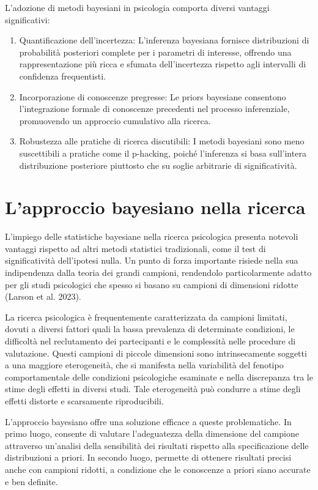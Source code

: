 \documentclass[
  letterpaper,
  krantz2]{{[}./krantz{]}}
\providecommand{\tightlist}{%
  \setlength{\itemsep}{0pt}\setlength{\parskip}{0pt}}\usepackage{longtable,booktabs,array}
\begin{document}
L'adozione di metodi bayesiani in psicologia comporta diversi vantaggi
significativi:

\begin{enumerate}
\def\labelenumi{\arabic{enumi}.}
\tightlist
\item
  Quantificazione dell'incertezza: L'inferenza bayesiana fornisce
  distribuzioni di probabilità posteriori complete per i parametri di
  interesse, offrendo una rappresentazione più ricca e sfumata
  dell'incertezza rispetto agli intervalli di confidenza frequentisti.
\item
  Incorporazione di conoscenze pregresse: Le priors bayesiane consentono
  l'integrazione formale di conoscenze precedenti nel processo
  inferenziale, promuovendo un approccio cumulativo alla ricerca.
\item
  Robustezza alle pratiche di ricerca discutibili: I metodi bayesiani
  sono meno suscettibili a pratiche come il p-hacking, poiché
  l'inferenza si basa sull'intera distribuzione posteriore piuttosto che
  su soglie arbitrarie di significatività.
\end{enumerate}

\section{L'approccio bayesiano nella
ricerca}\label{lapproccio-bayesiano-nella-ricerca}

L'impiego delle statistiche bayesiane nella ricerca psicologica presenta
notevoli vantaggi rispetto ad altri metodi statistici tradizionali, come
il test di significatività dell'ipotesi nulla. Un punto di forza
importante risiede nella sua indipendenza dalla teoria dei grandi
campioni, rendendolo particolarmente adatto per gli studi psicologici
che spesso si basano su campioni di dimensioni ridotte (Larson et al.
2023).

La ricerca psicologica è frequentemente caratterizzata da campioni
limitati, dovuti a diversi fattori quali la bassa prevalenza di
determinate condizioni, le difficoltà nel reclutamento dei partecipanti
e le complessità nelle procedure di valutazione. Questi campioni di
piccole dimensioni sono intrinsecamente soggetti a una maggiore
eterogeneità, che si manifesta nella variabilità del fenotipo
comportamentale delle condizioni psicologiche esaminate e nella
discrepanza tra le stime degli effetti in diversi studi. Tale
eterogeneità può condurre a stime degli effetti distorte e scarsamente
riproducibili.

L'approccio bayesiano offre una soluzione efficace a queste
problematiche. In primo luogo, consente di valutare l'adeguatezza della
dimensione del campione attraverso un'analisi della sensibilità dei
risultati rispetto alla specificazione delle distribuzioni a priori. In
secondo luogo, permette di ottenere risultati precisi anche con campioni
ridotti, a condizione che le conoscenze a priori siano accurate e ben
definite.
\end{document}
